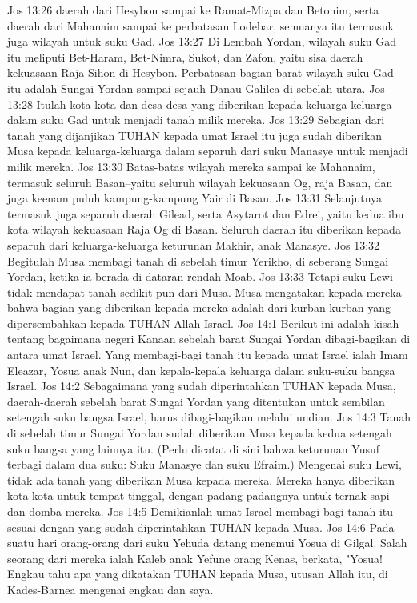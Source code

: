 Jos 13:26  daerah dari Hesybon sampai ke Ramat-Mizpa dan Betonim, serta daerah dari Mahanaim sampai ke perbatasan Lodebar, semuanya itu termasuk juga wilayah untuk suku Gad.
Jos 13:27  Di Lembah Yordan, wilayah suku Gad itu meliputi Bet-Haram, Bet-Nimra, Sukot, dan Zafon, yaitu sisa daerah kekuasaan Raja Sihon di Hesybon. Perbatasan bagian barat wilayah suku Gad itu adalah Sungai Yordan sampai sejauh Danau Galilea di sebelah utara.
Jos 13:28  Itulah kota-kota dan desa-desa yang diberikan kepada keluarga-keluarga dalam suku Gad untuk menjadi tanah milik mereka.
Jos 13:29  Sebagian dari tanah yang dijanjikan TUHAN kepada umat Israel itu juga sudah diberikan Musa kepada keluarga-keluarga dalam separuh dari suku Manasye untuk menjadi milik mereka.
Jos 13:30  Batas-batas wilayah mereka sampai ke Mahanaim, termasuk seluruh Basan--yaitu seluruh wilayah kekuasaan Og, raja Basan, dan juga keenam puluh kampung-kampung Yair di Basan.
Jos 13:31  Selanjutnya termasuk juga separuh daerah Gilead, serta Asytarot dan Edrei, yaitu kedua ibu kota wilayah kekuasaan Raja Og di Basan. Seluruh daerah itu diberikan kepada separuh dari keluarga-keluarga keturunan Makhir, anak Manasye.
Jos 13:32  Begitulah Musa membagi tanah di sebelah timur Yerikho, di seberang Sungai Yordan, ketika ia berada di dataran rendah Moab.
Jos 13:33  Tetapi suku Lewi tidak mendapat tanah sedikit pun dari Musa. Musa mengatakan kepada mereka bahwa bagian yang diberikan kepada mereka adalah dari kurban-kurban yang dipersembahkan kepada TUHAN Allah Israel.
Jos 14:1  Berikut ini adalah kisah tentang bagaimana negeri Kanaan sebelah barat Sungai Yordan dibagi-bagikan di antara umat Israel. Yang membagi-bagi tanah itu kepada umat Israel ialah Imam Eleazar, Yosua anak Nun, dan kepala-kepala keluarga dalam suku-suku bangsa Israel.
Jos 14:2  Sebagaimana yang sudah diperintahkan TUHAN kepada Musa, daerah-daerah sebelah barat Sungai Yordan yang ditentukan untuk sembilan setengah suku bangsa Israel, harus dibagi-bagikan melalui undian.
Jos 14:3  Tanah di sebelah timur Sungai Yordan sudah diberikan Musa kepada kedua setengah suku bangsa yang lainnya itu. (Perlu dicatat di sini bahwa keturunan Yusuf terbagi dalam dua suku: Suku Manasye dan suku Efraim.) Mengenai suku Lewi, tidak ada tanah yang diberikan Musa kepada mereka. Mereka hanya diberikan kota-kota untuk tempat tinggal, dengan padang-padangnya untuk ternak sapi dan domba mereka.
Jos 14:5  Demikianlah umat Israel membagi-bagi tanah itu sesuai dengan yang sudah diperintahkan TUHAN kepada Musa.
Jos 14:6  Pada suatu hari orang-orang dari suku Yehuda datang menemui Yosua di Gilgal. Salah seorang dari mereka ialah Kaleb anak Yefune orang Kenas, berkata, "Yosua! Engkau tahu apa yang dikatakan TUHAN kepada Musa, utusan Allah itu, di Kades-Barnea mengenai engkau dan saya.
